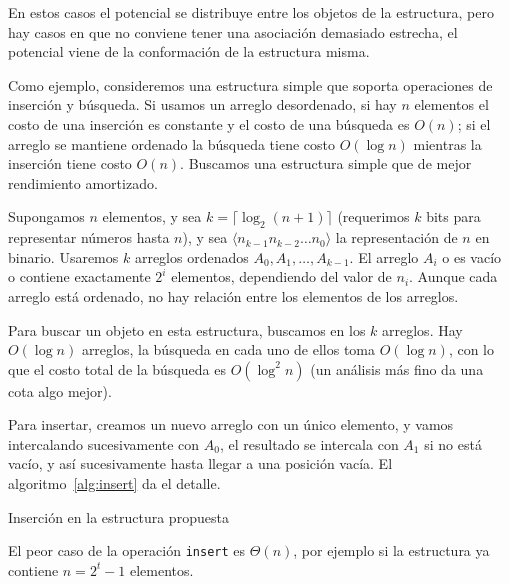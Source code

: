   En estos casos el potencial se distribuye entre los objetos de la estructura,
  pero hay casos en que no conviene tener una asociación demasiado estrecha,
  el potencial viene de la conformación de la estructura misma.

  Como ejemplo,
  consideremos una estructura simple
  que soporta operaciones de inserción y búsqueda.
  Si usamos un arreglo desordenado,
  si hay \(n\) elementos
  el costo de una inserción es constante
  y el costo de una búsqueda es \(O(n)\);
  si el arreglo se mantiene ordenado
  la búsqueda tiene costo \(O(\log n)\)
  mientras la inserción tiene costo \(O(n)\).
  Buscamos una estructura simple que de mejor rendimiento amortizado.

  Supongamos \(n\) elementos,
  y sea \(k = \lceil \log_2 (n + 1) \rceil\)
  (requerimos \(k\) bits para representar números hasta \(n\)),
  y sea \(\langle n_{k - 1} n_{k - 2} \ldots n_0 \rangle\)
  la representación de \(n\) en binario.
  Usaremos \(k\) arreglos ordenados
  \(A_0, A_1, \dotsc, A_{k - 1}\).
  El arreglo \(A_i\) o es vacío o contiene exactamente \(2^i\) elementos,
  dependiendo del valor de \(n_i\).
  Aunque cada arreglo está ordenado,
  no hay relación entre los elementos de los arreglos.

  Para buscar un objeto en esta estructura,
  buscamos en los \(k\) arreglos.
  Hay \(O(\log n)\) arreglos,
  la búsqueda en cada uno de ellos toma \(O(\log n)\),
  con lo que el costo total de la búsqueda es \(O(\log^2 n)\)
  (un análisis más fino da una cota algo mejor).

  Para insertar,
  creamos un nuevo arreglo con un único elemento,
  y vamos intercalando sucesivamente con \(A_0\),
  el resultado se intercala con \(A_1\) si no está vacío,
  y así sucesivamente
  hasta llegar a una posición vacía.
  El algoritmo~\ref{alg:insert} da el detalle.
  \begin{algorithm}[ht]
    \DontPrintSemicolon\Indp

    \caption{Inserción en la estructura propuesta}
    \label{alg:insert}
  \end{algorithm}
  El peor caso de la operación \verb+insert+ es \(\Theta(n)\),
  por ejemplo si la estructura ya contiene \(n = 2^t - 1\) elementos.

